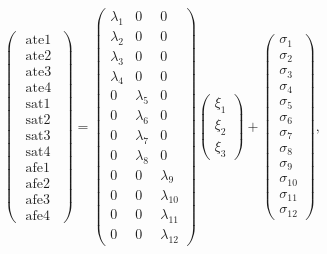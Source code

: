 \documentclass[withoutpreface,bwprint]{cumcmthesis} %
\begin{document}
\begin{center}
$
\left(\begin{array}{c}
	\text { ate1 } \\
	\text { ate2 }  \\
	\text { ate3 }  \\
	\text { ate4 }  \\
	\text { sat1 } \\
	\text { sat2 } \\
	\text { sat3 } \\
	\text { sat4 } \\
	\text { afe1 } \\
	\text { afe2 }  \\
	\text { afe3 }  \\
	\text { afe4 }  
\end{array}\right)=\left(\begin{array}{ccc}
	\lambda_{1} & 0 & 0 \\
	\lambda_{2} & 0 & 0 \\
	\lambda_{3} & 0 & 0 \\
	\lambda_{4} & 0 & 0 \\
	0 & \lambda_{5} & 0 \\
	0 & \lambda_{6} & 0 \\
	0 & \lambda_{7} & 0 \\
	0 & \lambda_{8} & 0 \\
	0 & 0 & \lambda_{9} \\
	0 & 0 & \lambda_{10} \\
	0 & 0 & \lambda_{11} \\
	0 & 0 & \lambda_{12}
\end{array}\right)\left(\begin{array}{c}
	\xi_{1} \\
	\xi_{2} \\
	\xi_{3}
\end{array}\right)+\left(\begin{array}{c}
	\sigma_{1} \\
	\sigma_{2} \\
	\sigma_{3} \\
	\sigma_{4} \\
	\sigma_{5} \\
	\sigma_{6} \\
	\sigma_{7} \\
	\sigma_{8} \\
	\sigma_{9} \\
	\sigma_{10} \\
	\sigma_{11} \\
	 \sigma_{12} 
\end{array}\right) 
,$


\end{center}
\end{document}
